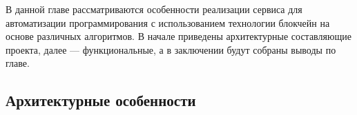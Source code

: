 В данной главе рассматриваются особенности реализации сервиса для
автоматизации программирования с использованием технологии блокчейн на основе
различных алгоритмов. В начале приведены архитектурные составляющие проекта,
далее --- функциональные, а в заключении будут собраны выводы по главе.

\subsection{Архитектурные особенности}

